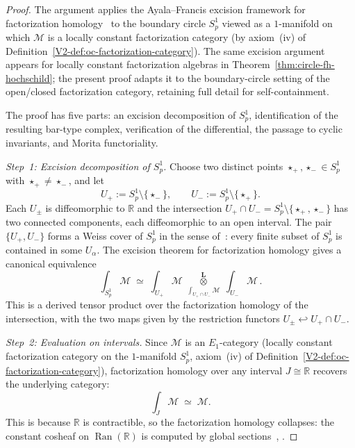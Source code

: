\begin{proof}
The argument applies the Ayala--Francis excision framework
for factorization homology~\cite{AF15} to the boundary circle
$S^1_p$ viewed as a $1$-manifold on which $\mathcal{M}$ is a
locally constant factorization category (by axiom~(iv) of
Definition~\ref*{V2-def:oc-factorization-category}). The same
excision argument appears for locally constant factorization
algebras in
Theorem~\ref{thm:circle-fh-hochschild}; the present proof
adapts it to the boundary-circle setting of the open/closed
factorization category, retaining full detail for self-containment.

The proof has five parts: an excision decomposition of
$S^1_p$, identification of the resulting bar-type complex,
verification of the differential, the passage to cyclic
invariants, and Morita functoriality.

\medskip
\noindent\textit{Step~1: Excision decomposition of $S^1_p$.}
Choose two distinct points $\star_+, \star_- \in S^1_p$ with
$\star_+ \ne \star_-$, and let
\begin{equation}\label{eq:thqg-excision-cover}
U_+ := S^1_p \setminus \{\star_-\},
\qquad
U_- := S^1_p \setminus \{\star_+\}.
\end{equation}
Each $U_\pm$ is diffeomorphic to $\mathbb{R}$ and the intersection
$U_+ \cap U_- = S^1_p \setminus \{\star_+, \star_-\}$ has two
connected components, each diffeomorphic to an open interval.
The pair $\{U_+, U_-\}$ forms a Weiss cover of $S^1_p$ in the
sense of~\cite{AF15}: every finite subset of $S^1_p$ is contained
in some $U_\alpha$. The excision theorem for factorization
homology \cite[Theorem~3.24]{AF15} gives a canonical equivalence
\begin{equation}\label{eq:thqg-excision-formula}
\int_{S^1_p} \mathcal{M}
\;\simeq\;
\int_{U_+} \mathcal{M}
\;\underset{\int_{U_+ \cap U_-} \mathcal{M}}
{\overset{\mathbf{L}}{\otimes}}\;
\int_{U_-} \mathcal{M}\,.
\end{equation}
This is a derived tensor product over the factorization homology
of the intersection, with the two maps given by the restriction
functors $U_\pm \hookleftarrow U_+ \cap U_-$.

\medskip
\noindent\textit{Step~2: Evaluation on intervals.}
Since $\mathcal{M}$ is an $E_1$-category (locally constant
factorization category on the $1$-manifold $S^1_p$, axiom~(iv)
of Definition~\ref*{V2-def:oc-factorization-category}),
factorization homology over any interval
$J \cong \mathbb{R}$ recovers the underlying category:
\begin{equation}\label{eq:thqg-interval-fh}
\int_J \mathcal{M} \;\simeq\; \mathcal{M}.
\end{equation}
This is because $\mathbb{R}$ is contractible, so the
factorization homology collapses: the constant cosheaf on
$\operatorname{Ran}(\mathbb{R})$ is computed by global
sections~\cite[Proposition~5.4.5.15]{HA},
\cite[Theorem~3.19]{AF15}.


\end{proof}
